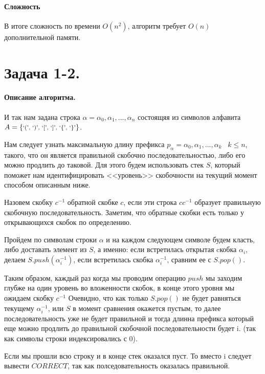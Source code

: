 \documentclass[12pt]{article}
\begin{document}
\paragraph{Сложность}
В итоге сложность по времени $ O(n^2) $, алгоритм требует $ O(n) $ дополнительной памяти.




\section{Задача 1-2.} 
\paragraph{Описание алгоритма.}
И так нам задана строка $ \alpha = \alpha_0, \alpha_1, ..., \alpha_n$ состоящяя
из символов алфавита 
$ A = \left\{ 
    \mbox{\footnotesize{`(', `)', `[', `]', `\{', `\}'}}
\right\} $.

Нам следует узнать максимальную длину префикса $ p_{\alpha} = \alpha_0, \alpha_1, ..., \alpha_k \;\;\; k \le n$, такого, что он является
правильной скобочно последовательностью, либо его можно продлить до таковой. Для этого будем использовать стек $ S $,
который поможет нам идентифицировать <<уровень>> скобочности на текущий момент способом
описанным ниже.

Назовем скобку $ c^{-1} $ обратной скобке $ c $, если эти строка $ cc^{-1} $ образует правильную скобочную последовательность.
Заметим, что обратные скобки есть только у открывающихся скобок по определению.

Пройдем по символам строки $ \alpha $ и на каждом следующем символе будем класть, либо доставать элемент из $ S $, а именно:
если встретилась открытая cкобка $ \alpha_i $, делаем $ S.push(\alpha_i^{-1}) $, если встретилась скобка $\alpha_i^{-1}$, сравним ее 
с $ S.pop() $.

Таким образом, каждый раз когда мы проводим операцию $ push $ мы заходим глубже на один уровень во вложенности скобок, в
конце этого уровня мы ожидаем скобку $ c^{-1} $
Очевидно, что как только $ S.pop() $ не будет равняться текущему $ \alpha_i^{-1} $, или $ S $ в момент сравнения окажется пустым, 
то далее последовательность уже не будет правильной и тогда длинна префикса который еще можно продлить до правильной скобочной 
последовательности будет i. (так как символы строки индексировались с 0).

Если мы прошли всю строку и в конце стек оказался пуст. То вместо i следует вывести $ CORRECT $, так как полседовательность оказалась правильной.
\end{document}
